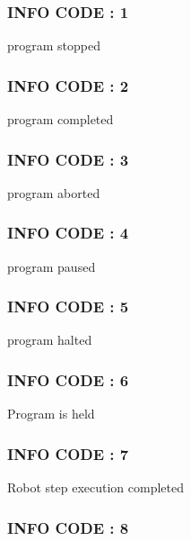  \subsubsection*{I\-N\-F\-O C\-O\-D\-E \-: 1 }

program stopped



 \subsubsection*{I\-N\-F\-O C\-O\-D\-E \-: 2 }

program completed



 \subsubsection*{I\-N\-F\-O C\-O\-D\-E \-: 3 }

program aborted



 \subsubsection*{I\-N\-F\-O C\-O\-D\-E \-: 4 }

program paused



 \subsubsection*{I\-N\-F\-O C\-O\-D\-E \-: 5 }

program halted



 \subsubsection*{I\-N\-F\-O C\-O\-D\-E \-: 6 }

Program is held



 \subsubsection*{I\-N\-F\-O C\-O\-D\-E \-: 7 }

Robot step execution completed



 \subsubsection*{I\-N\-F\-O C\-O\-D\-E \-: 8 }

